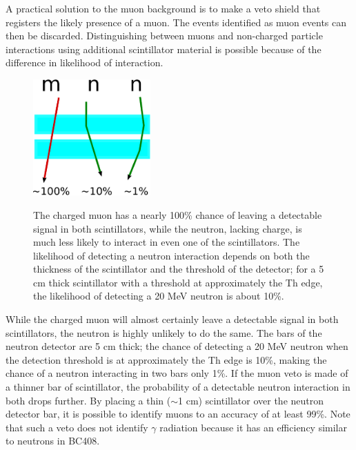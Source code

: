 A practical solution to the muon background is to make a veto shield that registers the likely presence of a muon.  The events identified as muon events can then be discarded.  Distinguishing between muons and non-charged particle interactions using additional scintillator material is possible because of the difference in likelihood of interaction.  
\begin{figure}[hp]
\centering
\includegraphics[width=0.4\textwidth]{figures/simpleVeto.eps}
\label{fig:simpleVeto}
\caption{The charged muon has a nearly 100\% chance of leaving a detectable signal in both scintillators, while the neutron, lacking charge, is much less likely to interact in even one of the scintillators.  The likelihood of detecting a neutron interaction depends on both the thickness of the scintillator and the threshold of the detector; for a 5 cm thick scintillator with a threshold at approximately the Th edge, the likelihood of detecting a 20 MeV neutron is about 10\%.}
\end{figure}
While the charged muon will almost certainly leave a detectable signal in both scintillators, the neutron is highly unlikely to do the same.  The bars of the neutron detector are 5 cm thick; the chance of detecting a 20 MeV neutron when the detection threshold is at approximately the Th edge is 10\%, making the chance of a neutron interacting in two bars only 1\%.  If the muon veto is made of a thinner bar of scintillator, the probability of a detectable neutron interaction in both drops further.  By placing a thin ($\sim$1 cm) scintillator over the neutron detector bar, it is possible to identify muons to an accuracy of at least 99\%.  Note that such a veto does not identify $\gamma$ radiation because it has an efficiency similar to neutrons in BC408.

